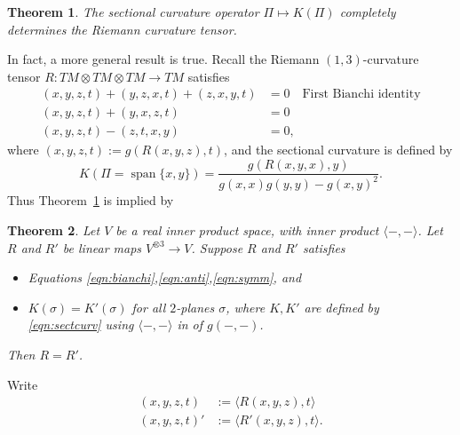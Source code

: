 \documentclass[12pt]{article}
\DeclareMathOperator{\SPAN}{span}
\newtheorem{theorem}{Theorem}
\begin{document}
\begin{theorem}\label{thm:thm1}
The sectional curvature operator $\Pi\mapsto K(\Pi)$ completely determines the Riemann curvature tensor.
\end{theorem}

In fact, a more general result is true.  Recall the Riemann $(1,3)$-curvature tensor $R\colon TM\otimes TM\otimes TM\to TM$ satisfies
\begin{align}
(x,y,z,t)+(y,z,x,t)+(z,x,y,t)&=0\quad\text{First Bianchi identity}\label{eqn:bianchi}\\
(x,y,z,t)+(y,x,z,t)&=0\label{eqn:anti}\\
(x,y,z,t)-(z,t,x,y)&=0,\label{eqn:symm}
\end{align}
where $(x,y,z,t):=g(R(x,y,z),t)$, and the sectional curvature is defined by
\begin{equation}
K(\Pi=\SPAN\{x,y\})=\frac{g(R(x,y,x),y)}{g(x,x)g(y,y)-g(x,y)^2}.\label{eqn:sectcurv}
\end{equation}
Thus Theorem~\ref{thm:thm1} is implied by

\begin{theorem}\label{thm:thm2}
Let $V$ be a real inner product space, with inner product $\langle-,-\rangle$.  Let $R$ and $R'$ be linear maps $V^{\otimes 3}\to V$.  Suppose $R$ and $R'$ satisfies
\begin{itemize}
\item Equations \eqref{eqn:bianchi},\eqref{eqn:anti},\eqref{eqn:symm}, and
\item $K(\sigma)=K'(\sigma)$ for all $2$-planes $\sigma$, where $K,K'$ are defined by \eqref{eqn:sectcurv} using $\langle -,-\rangle$ in  of $g(-,-)$.
\end{itemize}
Then $R=R'$.
\end{theorem}

Write
\begin{align*}
(x,y,z,t)&:=\langle R(x,y,z),t\rangle\\
(x,y,z,t)'&:=\langle R'(x,y,z),t\rangle.
\end{align*}
\end{document}
